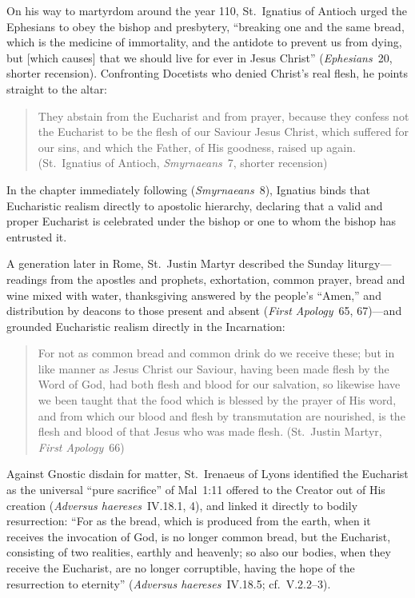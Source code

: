 On his way to martyrdom around the year 110, St.~Ignatius of Antioch urged the Ephesians to obey the bishop and presbytery, ``breaking one and the same bread, which is the medicine of immortality, and the antidote to prevent us from dying, but [which causes] that we should live for ever in Jesus Christ'' (\emph{Ephesians}~20, shorter recension). Confronting Docetists who denied Christ's real flesh, he points straight to the altar:
\begin{quotation}
They abstain from the Eucharist and from prayer, because they confess not the Eucharist to be the flesh of our Saviour Jesus Christ, which suffered for our sins, and which the Father, of His goodness, raised up again. (St.~Ignatius of Antioch, \emph{Smyrnaeans}~7, shorter recension)
\end{quotation}
In the chapter immediately following (\emph{Smyrnaeans}~8), Ignatius binds that Eucharistic realism directly to apostolic hierarchy, declaring that a valid and proper Eucharist is celebrated under the bishop or one to whom the bishop has entrusted it.

A generation later in Rome, St.~Justin Martyr described the Sunday liturgy---readings from the apostles and prophets, exhortation, common prayer, bread and wine mixed with water, thanksgiving answered by the people's ``Amen,'' and distribution by deacons to those present and absent (\emph{First Apology}~65, 67)---and grounded Eucharistic realism directly in the Incarnation:
\begin{quotation}
For not as common bread and common drink do we receive these; but in like manner as Jesus Christ our Saviour, having been made flesh by the Word of God, had both flesh and blood for our salvation, so likewise have we been taught that the food which is blessed by the prayer of His word, and from which our blood and flesh by transmutation are nourished, is the flesh and blood of that Jesus who was made flesh. (St.~Justin Martyr, \emph{First Apology}~66)
\end{quotation}

Against Gnostic disdain for matter, St.~Irenaeus of Lyons identified the Eucharist as the universal ``pure sacrifice'' of Mal~1:11 offered to the Creator out of His creation (\emph{Adversus haereses}~IV.18.1, 4), and linked it directly to bodily resurrection: ``For as the bread, which is produced from the earth, when it receives the invocation of God, is no longer common bread, but the Eucharist, consisting of two realities, earthly and heavenly; so also our bodies, when they receive the Eucharist, are no longer corruptible, having the hope of the resurrection to eternity'' (\emph{Adversus haereses}~IV.18.5; cf.~V.2.2--3).

